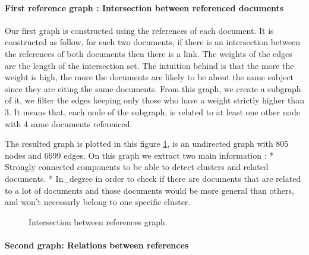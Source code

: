 \documentclass[article,twocolumn]{IEEEtran}
\begin{document}
    \hypertarget{first-reference-graph-intersection-between-referenced-documents}{%
\paragraph{First reference graph : Intersection between referenced
documents}\label{first-reference-graph-intersection-between-referenced-documents}}

Our first graph is constructed using the references of each document. It
is constructed as follow, for each two documents, if there is an
intersection between the references of both documents then there is a
link. The weights of the edges are the length of the intersection set.
The intuition behind is that the more the weight is high, the more the
documents are likely to be about the same subject since they are citing
the same documents. From this graph, we create a subgraph of it, we
filter the edges keeping only those who have a weight strictly higher
than 3. It means that, each node of the subgraph, is related to at least
one other node with 4 same documents referenced.



    The resulted graph is plotted in this figure \ref{intersection}, is an
undirected graph with 805 nodes and 6699 edges. On this graph we extract
two main information : * Strongly connected components to be able to
detect clusters and related documents. * In\_degree in order to check if
there are documents that are related to a lot of documents and those
documents would be more general than others, and won't necessarly belong
to one specific cluster.


    \begin{figure}
        \begin{center}\end{center}
        \caption{Intersection between references graph}
        \label{intersection}
    \end{figure}
    
    \hypertarget{second-graph-relations-between-references}{%
\paragraph{Second graph: Relations between
references}\label{second-graph-relations-between-references}}
\end{document}
